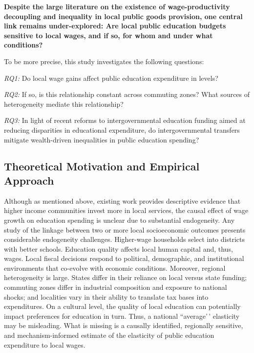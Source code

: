 \documentclass[
  10pt,
]{article}
\begin{document}
\textbf{Despite the large literature on the existence of
wage-productivity decoupling and inequality in local public goods
provision, one central link remains under-explored: Are local public
education budgets sensitive to local wages, and if so, for whom and
under what conditions?}

To be more precise, this study investigates the following questions:

\emph{RQ1:} Do local wage gains affect public education expenditure in
levels?

\emph{RQ2:} If so, is this relationship constant across commuting zones?
What sources of heterogeneity mediate this relationship?

\emph{RQ3:} In light of recent reforms to intergovernmental education
funding aimed at reducing disparities in educational expenditure, do
intergovernmental transfers mitigate wealth-driven inequalities in
public education spending?

\subsection{Theoretical Motivation and Empirical
Approach}\label{theoretical-motivation-and-empirical-approach}

Although as mentioned above, existing work provides descriptive evidence
that higher income communities invest more in local services, the causal
effect of wage growth on education spending is unclear due to
substantial endogeneity. Any study of the linkage between two or more
local socioeconomic outcomes presents considerable endogeneity
challenges. Higher-wage households select into districts with better
schools. Education quality affects local human capital and, thus, wages.
Local fiscal decisions respond to political, demographic, and
institutional environments that co-evolve with economic conditions.
Moreover, regional heterogeneity is large. States differ in their
reliance on local versus state funding; commuting zones differ in
industrial composition and exposure to national shocks; and localities
vary in their ability to translate tax bases into expenditures. On a
cultural level, the quality of local education can potentially impact
preferences for education in turn. Thus, a national ``average'\,'
elasticity may be misleading. What is missing is a causally identified,
regionally sensitive, and mechanism-informed estimate of the elasticity
of public education expenditure to local wages.
\end{document}
